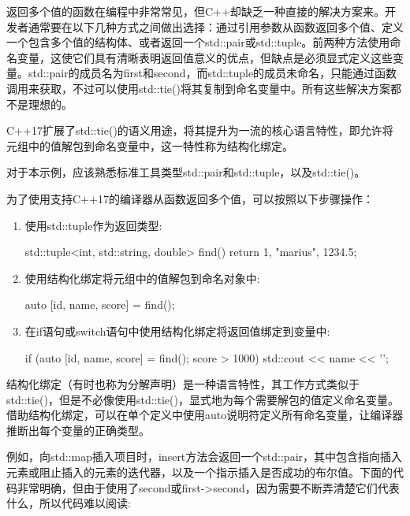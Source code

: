 
返回多个值的函数在编程中非常常见，但C++却缺乏一种直接的解决方案来。开发者通常要在以下几种方式之间做出选择：通过引用参数从函数返回多个值、定义一个包含多个值的结构体、或者返回一个std::pair或std::tuple。前两种方法使用命名变量，这使它们具有清晰表明返回值意义的优点，但缺点是必须显式定义这些变量。std::pair的成员名为first和second，而std::tuple的成员未命名，只能通过函数调用来获取，不过可以使用std::tie()将其复制到命名变量中。所有这些解决方案都不是理想的。

C++17扩展了std::tie()的语义用途，将其提升为一流的核心语言特性，即允许将元组中的值解包到命名变量中，这一特性称为结构化绑定。


对于本示例，应该熟悉标准工具类型std::pair和std::tuple，以及std::tie()。


为了使用支持C++17的编译器从函数返回多个值，可以按照以下步骤操作：

\begin{enumerate}
\item
使用std::tuple作为返回类型:

\begin{cpp}
std::tuple<int, std::string, double> find()
{
    return {1, "marius", 1234.5};
}
\end{cpp}

\item
使用结构化绑定将元组中的值解包到命名对象中:

\begin{cpp}
auto [id, name, score] = find();
\end{cpp}

\item
在if语句或switch语句中使用结构化绑定将返回值绑定到变量中:

\begin{cpp}
if (auto [id, name, score] = find(); score > 1000)
{
    std::cout << name << '\n';
}
\end{cpp}
\end{enumerate}


结构化绑定（有时也称为分解声明）是一种语言特性，其工作方式类似于std::tie()，但是不必像使用std::tie()，显式地为每个需要解包的值定义命名变量。借助结构化绑定，可以在单个定义中使用auto说明符定义所有命名变量，让编译器推断出每个变量的正确类型。

例如，向std::map插入项目时，insert方法会返回一个std::pair，其中包含指向插入元素或阻止插入的元素的迭代器，以及一个指示插入是否成功的布尔值。下面的代码非常明确，但由于使用了second或first->second，因为需要不断弄清楚它们代表什么，所以代码难以阅读:

